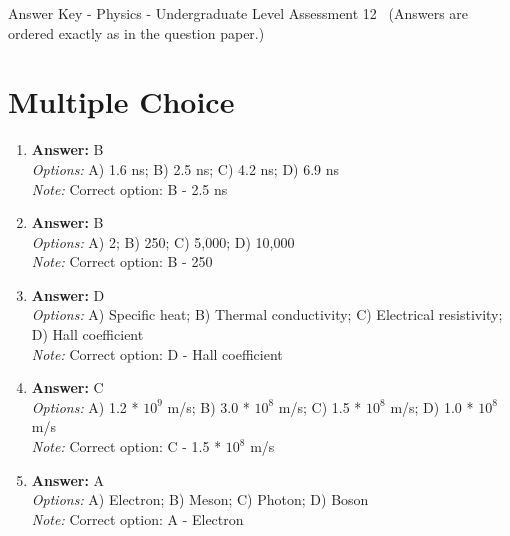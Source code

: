 \documentclass[12pt]{article}
\begin{document}
\begin{center}
Answer Key - Physics - Undergraduate Level Assessment 12 \
\small (Answers are ordered exactly as in the question paper.)
\end{center}

\section*{Multiple Choice}
\begin{enumerate}[label=\arabic*.]
\item \textbf{Answer:} B
\\ \textit{Options:} A) 1.6 ns; B) 2.5 ns; C) 4.2 ns; D) 6.9 ns
\\ \textit{Note:} Correct option: B - 2.5 ns
\item \textbf{Answer:} B
\\ \textit{Options:} A) 2; B) 250; C) 5,000; D) 10,000
\\ \textit{Note:} Correct option: B - 250
\item \textbf{Answer:} D
\\ \textit{Options:} A) Specific heat; B) Thermal conductivity; C) Electrical resistivity; D) Hall coefficient
\\ \textit{Note:} Correct option: D - Hall coefficient
\item \textbf{Answer:} C
\\ \textit{Options:} A) 1.2 * $10^9$ m/s; B) 3.0 * $10^8$ m/s; C) 1.5 * $10^8$ m/s; D) 1.0 * $10^8$ m/s
\\ \textit{Note:} Correct option: C - 1.5 * $10^8$ m/s
\item \textbf{Answer:} A
\\ \textit{Options:} A) Electron; B) Meson; C) Photon; D) Boson
\\ \textit{Note:} Correct option: A - Electron
\end{enumerate}
\end{document}
